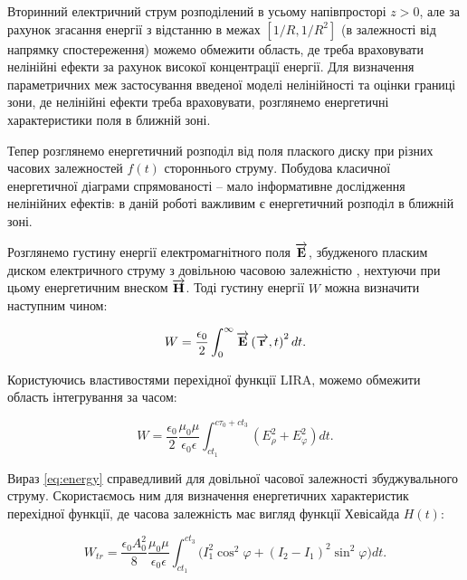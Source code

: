 Вторинний електричний струм розподілений в усьому напівпросторі $ z > 0 $,
але за рахунок згасання енергії з відстанню в межах $ [1/R, 1/R^2] $ (в 
залежності від напрямку спостереження) можемо обмежити область, де треба 
враховувати нелінійні ефекти за рахунок високої концентрації енергії. Для 
визначення параметричних меж застосування введеної моделі нелінійності та 
оцінки границі зони, де нелінійні ефекти треба враховувати, розглянемо 
енергетичні характеристики поля в ближній зоні.

Тепер розглянемо енергетичний розподіл від поля плаского диску при різних
часових залежностей $ f(t) $ стороннього струму. Побудова класичної 
енергетичної діаграми спрямованості -- мало інформативне дослідження 
нелінійних ефектів: в даній роботі важливим є енергетичний розподіл в 
ближній зоні.

Розглянемо густину енергії електромагнітного поля $ \overrightarrow{\mathbf E} $, збудженого 
пласким диском електричного струму з довільною часовою залежністю
\cite{imp:Schantz2018}, нехтуючи при цьому енергетичним внеском 
$ \overrightarrow{\mathbf H} $. Тоді густину енергії $ W $ можна визначити наступним чином: 


\begin{equation} \label{eq:energy}
W = \frac{\epsilon_0}{2} \int_0^\infty \overrightarrow{\mathbf E} \left( \overrightarrow{\mathbf r},t \right)^2 dt.
\end{equation}

Користуючись властивостями перехідної функції LIRA, можемо обмежити
область інтегрування за часом:

\begin{equation} \label{eq:energy}
W = \frac{\epsilon_0}{2} \frac{\mu_0 \mu}{\epsilon_0 \epsilon}
\int_{ct_1}^{c\tau_0+ct_3} \left( E_\rho^2 + E_\varphi^2 \right) dt.
\end{equation}

Вираз \eqref{eq:energy} справедливий для довільної часової залежності 
збуджувального струму. Скористаємось ним для визначення енергетичних 
характеристик перехідної функції, де часова залежність має вигляд функції
Хевісайда $ H(t) $:

%
\begin{equation} \label{eq:energy_tr}
W_{tr} = \frac{\epsilon_0 A_0^2}{8} \frac{\mu_0 \mu}{\epsilon_0 \epsilon}
\int_{ct_1}^{ct_3}  \Big( I_1^2 \cos^2 \varphi + 
\left( I_2 - I_1 \right)^2 \sin^2 \varphi \Big) dt.
\end{equation}

